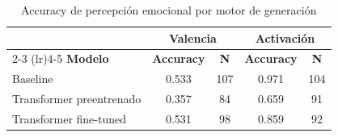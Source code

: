 \begin{table}[htbp]
\centering
\caption{Accuracy de percepción emocional por motor de generación}
\label{tab:accuracy_by_model}
\begin{tabular}{lcccc}
\toprule
& \multicolumn{2}{c}{\textbf{Valencia}} & \multicolumn{2}{c}{\textbf{Activación}} \\
\cmidrule(lr){2-3} \cmidrule(lr){4-5}
\textbf{Modelo} & \textbf{Accuracy} & \textbf{N} & \textbf{Accuracy} & \textbf{N} \\
\midrule
Baseline & 0.533 & 107 & 0.971 & 104 \\
Transformer preentrenado & 0.357 & 84 & 0.659 & 91 \\
Transformer fine-tuned & 0.531 & 98 & 0.859 & 92 \\
\bottomrule
\end{tabular}
\end{table}
